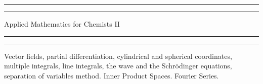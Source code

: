 


\begin{titlepage} %

	\centering %
	
	\scshape %
	
	\vspace*{\baselineskip} %
	
	
	\rule{\textwidth}{1.6pt}\vspace*{-\baselineskip}\vspace*{2pt} %
	\rule{\textwidth}{0.4pt} %
	
	\vspace{\baselineskip} %
	
	{\LARGE Applied Mathematics for Chemists II} %
	
	\vspace{0.3\baselineskip} %
	
	\rule{\textwidth}{0.4pt}\vspace*{-\baselineskip}\vspace{3.2pt} %
	\rule{\textwidth}{1.6pt} %
	
	\vspace{2\baselineskip} %
	
	
	Vector fields, partial differentiation, cylindrical and spherical coordinates, multiple integrals, line integrals, the wave and the Schr\"odinger equations, separation of variables method. Inner Product Spaces. Fourier Series. %
	
	\vspace*{3\baselineskip} %
	
	

\end{titlepage}
